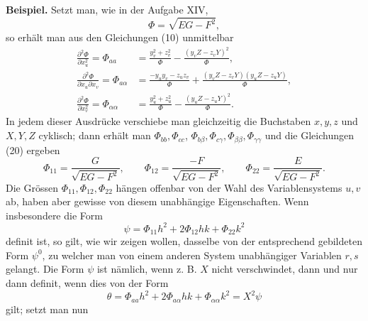 \documentclass[11pt,a4paper,leqno]{article}
\begin{document}
\textbf{Beispiel.} Setzt man, wie in der Aufgabe XIV,
\[
\Phi=\sqrt{EG-F^2},
\]
so erhält man aus den Gleichungen (10) unmittelbar
\[
\begin{aligned}
\frac{\partial^2\Phi}{\partial x_u^2}=\Phi_{aa}
&=\frac{y_v^2+z_v^2}{\Phi}
-\frac{(y_vZ-z_vY)^2}{\Phi},\\
\frac{\partial^2\Phi}{\partial x_u\partial x_v}=\Phi_{a\alpha}
&=\frac{-y_uy_v-z_uz_v}{\Phi}
+\frac{(y_vZ-z_vY)(y_uZ-z_uY)}{\Phi},\\
\frac{\partial^2\Phi}{\partial x_v^2}=\Phi_{\alpha\alpha}
&=\frac{y_u^2+z_u^2}{\Phi}
-\frac{(y_uZ-z_uY)^2}{\Phi}.
\end{aligned}
\]
In jedem dieser Ausdrücke verschiebe man gleichzeitig die Buchstaben
$x,y,z$ und $X,Y,Z$ cyklisch; dann erhält man $\Phi_{bb},\Phi_{cc}$,
$\Phi_{b\beta},\Phi_{c\gamma},\Phi_{\beta\beta},\Phi_{\gamma\gamma}$ und die Gleichungen (20) ergeben
\[
\Phi_{11}=\frac{G}{\sqrt{EG-F^2}},\qquad
\Phi_{12}=\frac{-F}{\sqrt{EG-F^2}},\qquad
\Phi_{22}=\frac{E}{\sqrt{EG-F^2}}.
\]
Die Grössen $\Phi_{11},\Phi_{12},\Phi_{22}$ hängen offenbar von der Wahl
des Variablensystems $u,v$ ab, haben aber gewisse von diesem
unabhängige Eigenschaften. Wenn insbesondere die Form
\[
\psi=\Phi_{11}h^2+2\Phi_{12}hk+\Phi_{22}k^2
\]
definit ist, so gilt, wie wir zeigen wollen, dasselbe von der entsprechend
gebildeten Form $\psi^0$, zu welcher man von einem
anderen System unabhängiger Variablen $r,s$ gelangt. Die Form
$\psi$ ist nämlich, wenn z. B. $X$ nicht verschwindet, dann und nur
dann definit, wenn dies von der Form
\[
\theta=\Phi_{aa}h^2+2\Phi_{a\alpha}hk+\Phi_{\alpha\alpha}k^2=X^2\psi
\]
gilt; setzt man nun
\end{document}
